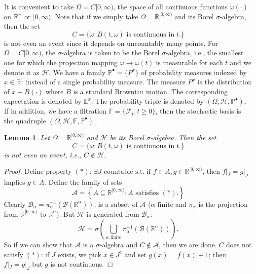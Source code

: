 \documentclass{article}
\theoremstyle{plain}
\newtheorem{lemma}{Lemma}
\theoremstyle{definition}
\begin{document}
It is convenient to take $\Omega=C{[0,\infty)}$, the space of all continuous functions $\omega(\cdot)$ on $\mathbb{R}^+$ or $[0,\infty)$. Note that if we simply take $\Omega=\mathbb{R}^{[0,\infty)}$ and its Borel $\sigma$-algebra, then the set
$$C=\{\omega:B(t,\omega)\text{ is continuous in }t.\}$$
is not even an event since it depends on uncountably many points. For $\Omega=C{[0,\infty)}$, the $\sigma$-algebra is taken to be the Borel $\sigma$-algebra, i.e., the smallest one for which the projection mapping $\omega\rightarrow\omega(t)$ is measurable for each $t$ and we denote it as $\mathcal{H}$. We have a family $\mathbb{P}^\bullet=\{P^x\}$ of probability measures indexed by $x\in\mathbb{R}^1$ instead of a single probability measure. The measure $P^x$ is the distribution of $x+B(\cdot)$ where $B$ is a standard Brownian motion. The corresponding expectation is denoted by $\mathbb{E}^x$. The probability triple is denoted by $(\Omega,\mathcal{H},\mathbb{P}^\bullet)$. If in addition, we have a filtration $\mathbb{F}=\{\mathcal{F}_t:t\ge 0\}$, then the stochastic basis is the quadruple $(\Omega,\mathcal{H},\mathbb{F},\mathbb{P}^\bullet)$ \citep{dabrowska2020stochastic}.

\begin{lemma}
Let $\Omega=\mathbb{R}^{[0,\infty)}$ and $\mathcal{H}$ be its Borel $\sigma$-algebra. Then the set
$$C=\{\omega:B(t,\omega)\text{ is continuous in }t.\}$$
is not even an event, i.e., $C\not\in\mathcal{H}$.
\end{lemma}

\begin{proof} 
Define property $(*)$: $\exists J\text{ countable s.t. if } f\in A,g\in \mathbb{R}^{[0,\infty)}$, then $f|_J=g|_J$ implies $g\in A.$ Define the family of sets
$$\mathcal{A}=\left\{A\subseteq\mathbb{R}^{[0,\infty)}: A\text{ satisfies }(*).\right\}$$
Clearly $\mathcal{B}_\alpha=\pi_\alpha^{-1}(\mathcal{B}(\mathbb{R}^\alpha))$, is a subset of $\mathcal{A}$ ($\alpha\text{ finite}$ and $\pi_\alpha$ is the projection from $\mathbb{R}^{[0,\infty)}$ to $\mathbb{R}^\alpha$). But $\mathcal{H}$ is generated from $\mathcal{B}_\alpha$:
$$\mathcal{H}=\sigma\left(\bigcup_{\alpha\text{ finite}}\pi_\alpha^{-1}(\mathcal{B}(\mathbb{R}^\alpha))\right).$$
So if we can show that $\mathcal{A}$ is a $\sigma$-algebra and $C\not\in\mathcal{A}$, then we are done. $C$ does not satisfy $(*)$: if $J$ exists, we pick $x\in J^c$ and set $g(x)=f(x)+1$; then $f|_J=g|_J$ but $g$ is not continuous.
\end{proof}
\end{document}
